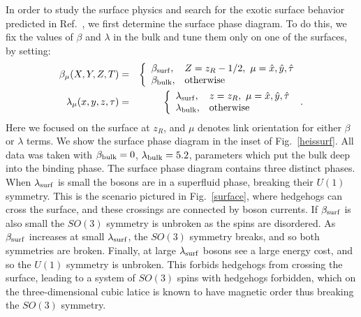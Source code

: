 In order to study the surface physics and search for the exotic surface behavior predicted in Ref.~\cite{SenthilVishwanath}, we first determine the surface phase diagram.
To do this, we fix the values of $\beta$ and $\lambda$ in the bulk and tune them only on one of the surfaces, by setting:
\begin{eqnarray}
\beta_\mu(X,Y,Z,T) &=&
\left\{
\begin{array}{ll}
\beta_{\rm surf}, & Z = z_R - 1/2, ~\mu=\hat{x},\hat{y},\hat{\tau}\\
\beta_{\rm bulk}, & {\rm otherwise}
\end{array}\right. ~
\label{bulkvsurf} \\
\lambda_\mu(x,y,z,\tau) &=&
\left\{
\begin{array}{ll}
\lambda_{\rm surf}, & z = z_R, ~\mu=\hat{x},\hat{y},\hat{\tau}\\
\lambda_{\rm bulk}, & {\rm otherwise }
\end{array}\right. ~.
\end{eqnarray}
Here we focused on the surface at $z_R$, and $\mu$ denotes link orientation for either $\beta$ or $\lambda$ terms.  We show the surface phase diagram in the inset of Fig.~\ref{heissurf}.  All data was taken with $\beta_{\rm bulk}=0$, $\lambda_{\rm bulk}=5.2$, parameters which put the bulk deep into the binding phase.  The surface phase diagram contains three distinct phases. When $\lambda_{\rm surf}$ is small the bosons are in a superfluid phase, breaking their $U(1)$ symmetry. This is the scenario pictured in Fig.~\ref{surface}, where hedgehogs can cross the surface, and these crossings are connected by boson currents. If $\beta_{\rm surf}$ is also small the $SO(3)$ symmetry is unbroken as the spins are disordered. As $\beta_{\rm surf}$ increases at small $\lambda_{\rm surf}$, the $SO(3)$ symmetry breaks, and so both symmetries are broken. Finally, at large $\lambda_{\rm surf}$ bosons see a large energy cost, and so the $U(1)$ symmetry is unbroken. This forbids hedgehogs from crossing the surface, leading to a system of $SO(3)$ spins with hedgehogs forbidden, which on the three-dimensional cubic latice is known to have magnetic order thus breaking the $SO(3)$ symmetry.\cite{LauDasgupta, LesikAshvin} 


